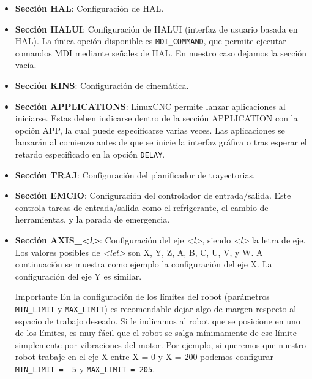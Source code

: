 \documentclass[english,spanish,a4paper,11pt]{article}
\begin{document}
\begin{itemize}
    \item \textbf{Sección HAL}: Configuración de \acf{HAL}.

    \item \textbf{Sección HALUI}: Configuración de HALUI (interfaz de usuario basada en HAL). La única opción disponible es \texttt{MDI\_COMMAND}, que permite ejecutar comandos \ac{MDI} mediante señales de \ac{HAL}. En nuestro caso dejamos la sección vacía.

    \item \textbf{Sección KINS}: Configuración de cinemática.

    \item \textbf{Sección APPLICATIONS}: LinuxCNC permite lanzar aplicaciones al iniciarse. Estas deben indicarse dentro de la sección APPLICATION con la opción APP, la cual puede especificarse varias veces. Las aplicaciones se lanzarán al comienzo antes de que se inicie la interfaz gráfica o tras esperar el retardo especificado en la opción \texttt{DELAY}.

    \item \textbf{Sección TRAJ}: Configuración del planificador de trayectorias.

    \item \textbf{Sección EMCIO}: Configuración del controlador de entrada/salida. Este controla tareas de entrada/salida como el refrigerante, el cambio de herramientas, y la parada de emergencia.

    \item \textbf{Sección AXIS\_\textit{<l>}}: Configuración del eje \textit{<l>}, siendo \textit{<l>} la letra de eje. Los valores posibles de \textit{<let>} son X, Y, Z, A, B, C, U, V, y W. A continuación se muestra como ejemplo la configuración del eje X. La configuración del eje Y es similar.

    \begin{admonition}{Importante}
         En la configuración de los límites del robot (parámetros \texttt{MIN\_LIMIT} y \texttt{MAX\_LIMIT}) es recomendable dejar algo de margen respecto al espacio de trabajo deseado. Si le indicamos al robot que se posicione en uno de los límites, es muy fácil que el robot se salga mínimamente de ese límite simplemente por vibraciones del motor. Por ejemplo, si queremos que nuestro robot trabaje en el eje X entre X = 0 y X = 200 podemos configurar \texttt{MIN\_LIMIT = -5} y \texttt{MAX\_LIMIT = 205}.
    \end{admonition}
    

\end{itemize}
\end{document}
